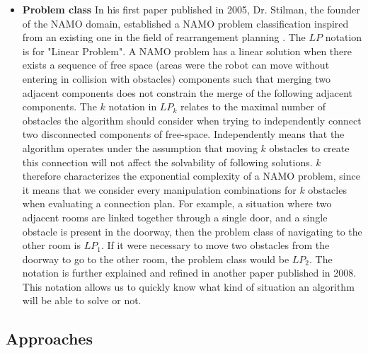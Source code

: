 \begin{itemize}
  \item \textbf{Problem class} In his first paper \parencite{stilman_navigation_2005} published in 2005, Dr. Stilman, the founder of the NAMO domain, established a NAMO problem classification inspired from an existing one in the field of rearrangement planning \parencite{ben-shahar_practical_1998}. The $LP$ notation is for "Linear Problem". A NAMO problem has a linear solution when there exists a sequence of free space (areas were the robot can move without entering in collision with obstacles) components such that merging two adjacent components does not constrain the merge of the following adjacent components. The $k$ notation in $LP_k$ relates to the maximal number of obstacles the algorithm should consider when trying to independently connect two disconnected components of free-space. Independently means that the algorithm operates under the assumption that moving $k$ obstacles to create this connection will not affect the solvability of following solutions. $k$ therefore characterizes the exponential complexity of a NAMO problem, since it means that we consider every manipulation combinations for $k$ obstacles when evaluating a connection plan. For example, a situation where two adjacent rooms are linked together through a single door, and a single obstacle is present in the doorway, then the problem class of navigating to the other room is $LP_1$. If it were necessary to move two obstacles from the doorway to go to the other room, the problem class would be $LP_2$. The notation is further explained and refined in another paper \parencite{stilman_planning_2008} published in 2008. This notation allows us to quickly know what kind of situation an algorithm will be able to solve or not.
\end{itemize}

\subsection{Approaches}

